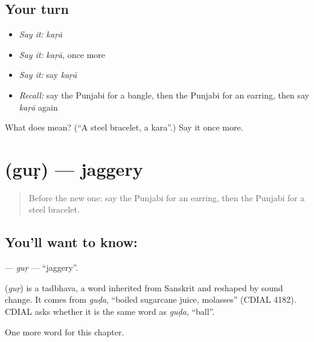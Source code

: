 \subsection*{Your turn}
\begin{itemize}
\raggedright
  \item \emph{Say it:} \emph{kaṛā}
  \item \emph{Say it:} \emph{kaṛā}, once more
  \item \emph{Say it:} say \emph{kaṛā}
  \item \emph{Recall:} say the Punjabi for a bangle, then the Punjabi for an earring, then say \emph{kaṛā} again
\end{itemize}

\begin{tcolorbox}[breakable,colback=teal!4,colframe=teal!35!black,title={Before you move on}]
What does  mean? (\textquotedblleft{}A steel bracelet, a kara\textquotedblright{}.) Say it once more.
\end{tcolorbox}
\section[\texorpdfstring{\pa{ਗੁੜ} (guṛ)}{ਗੁੜ (guṛ)}]{ (guṛ) — jaggery}

\label{lesson:PA-C121-gur}



\begin{quote}
Before the new one: say the Punjabi for an earring, then the Punjabi for a steel bracelet.
\end{quote}

\subsection*{You'll want to know: }
\textbf{} — \emph{guṛ} — \textquotedblleft{}jaggery\textquotedblright{}.

\begin{cousinweb}
\textbf{} (\emph{guṛ}) is a tadbhava, a word inherited from Sanskrit and reshaped by sound change. It comes from \emph{guḍa}, \textquotedblleft{}boiled sugarcane juice, molasses\textquotedblright{} (CDIAL 4182). CDIAL asks whether it is the same word as \emph{guḍa}, \textquotedblleft{}ball\textquotedblright{}.
\end{cousinweb}

\begin{grammarlens}[title={What you've built}]
One more word for this chapter.
\end{grammarlens}

